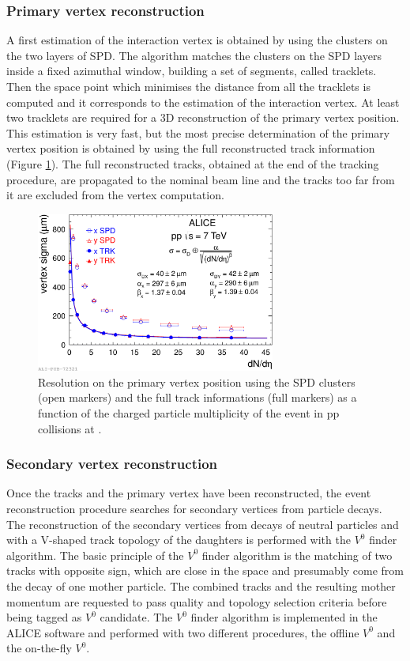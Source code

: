 \subsubsection{Primary vertex reconstruction}
A first estimation of the interaction vertex is obtained by using the clusters on the two layers of 
SPD. The algorithm matches the clusters on the SPD layers inside a fixed azimuthal window,
building a set of segments, called tracklets.
Then the space point which minimises the distance from all the tracklets is computed and it corresponds to the estimation of
the interaction vertex.
At least two tracklets are required for a 3D reconstruction of the primary vertex position.
This estimation is very fast, but the most precise determination of the primary vertex position is 
obtained by using the full reconstructed track information (Figure \ref{fig:vertres}).
The full reconstructed tracks, obtained at the end of the tracking procedure, are propagated to the
nominal beam line and the tracks too far from it are excluded from the vertex computation.

\begin{figure}
    \centering
    \includegraphics[width=0.7\textwidth]{gfx/vertexres}
	\caption{Resolution on the primary vertex position using the SPD clusters (open markers) and the full track informations (full markers) as a function of the charged particle multiplicity of the event in pp collisions at  \cite{alicemulti}.}
	\label{fig:vertres}
\end{figure}

\subsubsection{Secondary vertex reconstruction}
Once the tracks and the primary vertex have been reconstructed, the event reconstruction procedure
searches for secondary vertices from particle decays.
The reconstruction of the secondary vertices from decays of neutral particles and with a V-shaped track 
topology of the daughters is performed with the $V^{0}$ finder algorithm.
The basic principle of the $V^{0}$ finder algorithm is the matching of two tracks with opposite sign,
which are close in the space and presumably come from the decay of one mother particle.
The combined tracks and the resulting mother momentum are requested to pass quality and topology selection criteria
before being tagged as $V^{0}$ candidate.
The $V^{0}$ finder algorithm is implemented in the ALICE software and performed with two different
procedures, the offline $V^{0}$ and the on-the-fly $V^{0}$.

